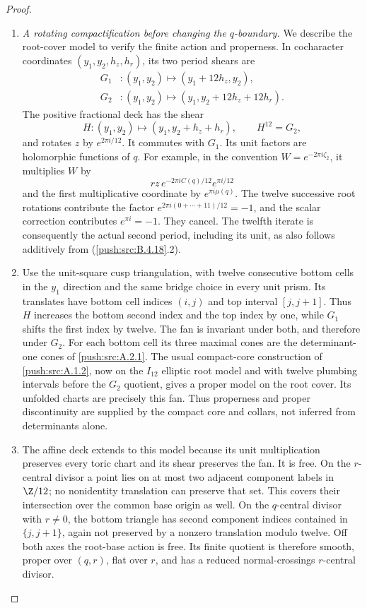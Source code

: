 \begin{proof}
\begin{enumerate}[label=\arabic*.,leftmargin=*]
\item \emph{A rotating compactification before changing the
$q$-boundary.}
We describe the root-cover model to verify the finite
action and properness. In cocharacter coordinates
$(y_1,y_2,h_z,h_r)$, its two period shears are
\[
 \begin{aligned}
 G_1 &: (y_1,y_2)\longmapsto(y_1+12h_z,y_2),\\
 G_2 &: (y_1,y_2)\longmapsto
                         (y_1,y_2+12h_z+12h_r).
 \end{aligned}
\]
The positive fractional deck has the shear
\[
 H:(y_1,y_2)\longmapsto(y_1,y_2+h_z+h_r),
 \qquad H^{12}=G_2,
 \tag{B.4.18.5}
\]
and rotates $z$ by $e^{2\pi i/12}$.
It commutes with $G_1$. Its unit factors are holomorphic
functions of $q$. For example, in the convention
$W=e^{-2\pi i\zeta_2}$, it multiplies $W$ by
\[
 r z\,e^{-2\pi i C(q)/12}e^{\pi i/12}
\]
and the first multiplicative coordinate by
$e^{\pi i\mu(q)}$. The twelve successive root rotations
contribute the factor
$e^{2\pi i(0+\cdots+11)/12}=-1$, and the scalar
correction contributes $e^{\pi i}=-1$.
They cancel. The twelfth iterate is consequently
the actual second period, including its unit, as
also follows additively from (\ref{push:src:B.4.18}.2).

\item Use the unit-square cusp triangulation, with twelve
consecutive bottom cells in the $y_1$ direction and
the same bridge choice in every unit prism. Its
translates have bottom cell indices $(i,j)$ and top
interval $[j,j+1]$. Thus $H$ increases the bottom
second index and the top index by one, while $G_1$
shifts the first index by twelve. The fan is invariant
under both, and therefore under $G_2$.
For each bottom cell its three maximal cones are
the determinant-one cones of \ref{push:src:A.2.1}. The usual
compact-core construction of \ref{push:src:A.1.2}, now on the
$I_{12}$ elliptic root model and with twelve
plumbing intervals before the $G_2$ quotient,
gives a proper model on the root cover. Its
unfolded charts are precisely this fan. Thus
properness and proper discontinuity are supplied
by the compact core and collars, not inferred
from determinants alone.

\item The affine deck extends to this model because its
unit multiplication preserves every toric chart
and its shear preserves the fan. It is free.
On the $r$-central divisor a point lies on at most
two adjacent component labels in $\Z/12$; no
nonidentity translation can preserve that set.
This covers their intersection over the common
base origin as well. On the $q$-central divisor
with $r\ne0$, the bottom triangle has second
component indices contained in $\{j,j+1\}$,
again not preserved by a nonzero translation
modulo twelve. Off both axes the root-base action
is free. Its finite quotient is therefore smooth,
proper over $(q,r)$, flat over $r$, and has a
reduced normal-crossings $r$-central divisor.


\end{enumerate}
\end{proof}
